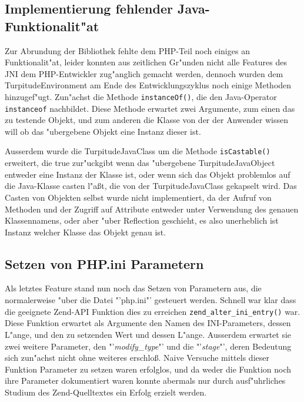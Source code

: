 \subsection{Implementierung fehlender Java-Funktionalit"at}
\label{sec:chap1:impl:14}

Zur Abrundung der Bibliothek fehlte dem PHP-Teil noch einiges an Funktionalit"at, leider konnten aus zeitlichen Gr"unden nicht alle 
Features des JNI dem PHP-Entwickler zug"anglich gemacht werden, dennoch wurden dem TurpitudeEnvironment am Ende des Entwicklungszyklus 
noch einige Methoden hinzugef"ugt. Zun"achst die Methode \texttt{instanceOf()}, die den Java-Operator \texttt{instanceof} nachbildet.
Diese Methode erwartet zwei Argumente, zum einen das zu testende Objekt, und zum anderen die Klasse von der der Anwender wissen will 
ob das "ubergebene Objekt eine Instanz dieser ist. 

Ausserdem wurde die TurpitudeJavaClass um die Methode \texttt{isCastable()} erweitert, die true zur"uckgibt wenn das "ubergebene TurpitudeJavaObject
entweder eine Instanz der Klasse ist, oder wenn sich das Objekt problemlos auf die Java-Klasse casten l"a\ss t, die von der TurpitudeJavaClass
gekapselt wird. Das Casten von Objekten selbst wurde nicht implementiert, da der Aufruf von Methoden und der Zugriff auf Attribute
entweder unter Verwendung des genauen Klassennamens, oder aber "uber Reflection geschieht, es also unerheblich ist Instanz welcher Klasse
das Objekt genau ist.

\subsection{Setzen von PHP.ini Parametern}
\label{sec:chap1:impl:15}

Als letztes Feature stand nun noch das Setzen von Parametern aus, die normalerweise "uber die Datei "'php.ini"' gesteuert werden.
Schnell war klar dass die geeignete Zend-API Funktion dies zu erreichen \texttt{zend\_alter\_ini\_entry()} war. Diese Funktion erwartet
als Argumente den Namen des INI-Parameters, dessen L"ange, und den zu setzenden Wert und dessen L"ange. Ausserdem erwartet sie zwei
weitere Parameter, den "'\emph{modify\_type}"' und die "'\emph{stage}"', deren Bedeutung sich zun"achst nicht ohne weiteres erschlo\ss .
Naive Versuche mittels dieser Funktion Parameter zu setzen waren erfolglos, und da weder die Funktion noch ihre Parameter dokumentiert
waren konnte abermals nur durch ausf"uhrliches Studium des Zend-Quelltextes ein Erfolg erzielt werden.

